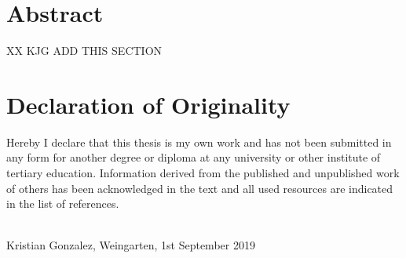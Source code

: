 \section*{Abstract}
XX KJG ADD THIS SECTION


\vspace*{13cm}

\section*{Declaration of Originality}
Hereby I declare that this thesis is my own work and has not been submitted in any form for another degree or diploma at any university or other institute of tertiary education. Information derived from the published and unpublished work of others has been acknowledged in the text and all used resources are indicated in the list of references.

\vspace{1cm}

\underline{\hspace{5cm}}\\

Kristian Gonzalez, Weingarten, 1st September 2019
